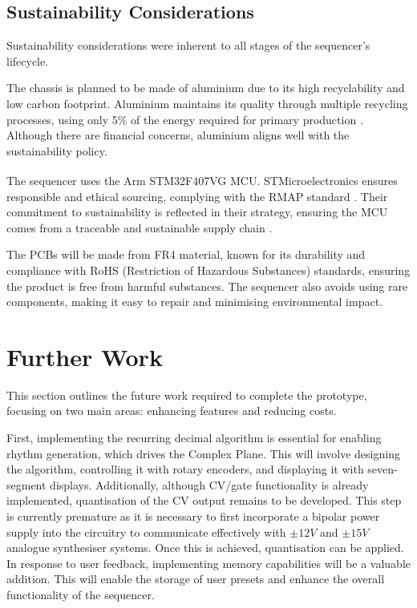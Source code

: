 \documentclass[12pt]{article}
\numberwithin{subsubsubsection}{subsubsection}
\begin{document}
\subsection{Sustainability Considerations}


Sustainability considerations were inherent to all stages of the sequencer's lifecycle.

The chassis is planned to be made of aluminium due to its high recyclability and low carbon footprint. Aluminium maintains its quality through multiple recycling processes, using only 5\% of the energy required for primary production \cite{ALUM}. Although there are financial concerns, aluminium aligns well with the sustainability policy.

The sequencer uses the Arm\textsuperscript{\textregistered} STM32F407VG MCU. STMicroelectronics ensures responsible and ethical sourcing, complying with the RMAP standard \cite{STM2}. Their commitment to sustainability is reflected in their strategy, ensuring the MCU comes from a traceable and sustainable supply chain \cite{STM3}.

The PCBs will be made from FR4 material, known for its durability and compliance with RoHS (Restriction of Hazardous Substances) standards, ensuring the product is free from harmful substances. The sequencer also avoids using rare components, making it easy to repair and minimising environmental impact.






\newpage
\section{Further Work}

This section outlines the future work required to complete the prototype, focusing on two main areas: enhancing features and reducing costs.

First, implementing the recurring decimal algorithm is essential for enabling rhythm generation, which drives the Complex Plane. This will involve designing the algorithm, controlling it with rotary encoders, and displaying it with seven-segment displays. Additionally, although CV/gate functionality is already implemented, quantisation of the CV output remains to be developed. This step is currently premature as it is necessary to first incorporate a bipolar power supply into the circuitry to communicate effectively with \(\pm 12V\) and \(\pm 15V\) analogue synthesiser systems. Once this is achieved, quantisation can be applied. In response to user feedback, implementing memory capabilities will be a valuable addition. This will enable the storage of user presets and enhance the overall functionality of the sequencer.
\end{document}
